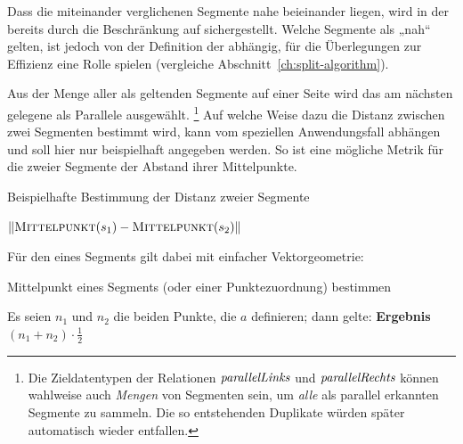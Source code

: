 \documentclass[../main/thesis.tex]{subfiles}
\begin{document}

Dass die miteinander verglichenen Segmente nahe beieinander liegen, wird in der  bereits durch die Beschränkung auf  sichergestellt.
Welche Segmente als „nah“ gelten, ist jedoch von der Definition der  abhängig, für die Überlegungen zur Effizienz eine Rolle spielen (vergleiche Abschnitt~\ref{ch:split-algorithm}).

Aus der Menge aller als  geltenden Segmente auf einer Seite wird das am nächsten gelegene als Parallele ausgewählt.%
\footnote{%
Die Zieldatentypen der Relationen $\relation{parallelLinks}$ und $\relation{parallelRechts}$ können wahlweise auch \emph{Mengen} von Segmenten sein, um \emph{alle} als parallel erkannten Segmente zu sammeln.
Die so entstehenden Duplikate würden später automatisch wieder entfallen.
}
Auf welche Weise dazu die Distanz zwischen zwei Segmenten bestimmt wird, kann vom speziellen Anwendungsfall abhängen und soll hier nur beispielhaft angegeben werden.
So ist eine mögliche Metrik für die  zweier Segmente der Abstand ihrer Mittelpunkte. \nopagebreak[3]


\begin{algorithmhere}{Beispielhafte Bestimmung der Distanz zweier Segmente}
\label{alg:Distanz}
\begin{algorithmic}
 $\abs[\textproc{Mittelpunkt}(s_1) - \textproc{Mittelpunkt}(s_2)]$%
\EndFunction
\end{algorithmic}
\end{algorithmhere}

\noindent Für den  eines Segments gilt dabei mit einfacher Vektorgeometrie: \nopagebreak[3]

\begin{algorithmhere}{Mittelpunkt eines Segments (oder einer Punktezuordnung) bestimmen}
\label{alg:Mittelpunkt}
\begin{algorithmic}
	\State Es seien $n_1$ und $n_2$ die beiden Punkte, die $a$ definieren; dann gelte:
	\State \textbf{Ergebnis} $(n_1 + n_2) \cdot \frac{1}{2}$
\EndFunction
\end{algorithmic}
\end{algorithmhere}
\end{document}
